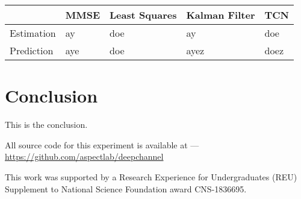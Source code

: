 \documentclass[twocolumn,letterpaper]{IEEEAerospaceCLS}  %
\begin{document}
\begin{table}[!h]
\begin{tabular}{|l|l|l|l|l|}
\hline
                            & MMSE                 & Least Squares        & Kalman Filter         & TCN                   \\ \hline
\multirow{3}{*}{Estimation} & \multirow{3}{*}{ay}  & \multirow{3}{*}{doe} & \multirow{3}{*}{ay}   & \multirow{3}{*}{doe}  \\
                            &                      &                      &                       &                       \\
                            &                      &                      &                       &                       \\ \hline
\multirow{3}{*}{Prediction} & \multirow{3}{*}{aye} & \multirow{3}{*}{doe} & \multirow{3}{*}{ayez} & \multirow{3}{*}{doez} \\
                            &                      &                      &                       &                       \\
                            &                      &                      &                       &                       \\ \hline
\end{tabular}
\end{table}


\section{Conclusion}
\label{sec:conclusion}
This is the conclusion.



All source code for this experiment is available at ---\\
\url{https://github.com/aspectlab/deepchannel}


\acknowledgments
This work was supported by a Research Experience for Undergraduates (REU) Supplement to National Science Foundation award CNS-1836695.
\newpage


\end{document}
